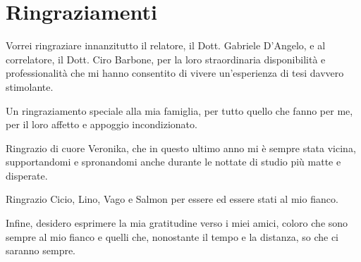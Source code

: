 \chapter{Ringraziamenti}
Vorrei ringraziare innanzitutto  il relatore, il Dott. Gabriele D'Angelo, e al correlatore, il Dott. Ciro Barbone, per la loro straordinaria disponibilità e professionalità che mi hanno consentito di vivere un'esperienza di tesi davvero stimolante.

 Un ringraziamento speciale alla mia famiglia, per tutto quello che fanno per me, per il loro affetto  e appoggio incondizionato.
 
 Ringrazio di cuore Veronika, che in questo ultimo anno mi è sempre stata  vicina, supportandomi  e spronandomi anche durante le nottate di studio più matte e disperate.

 Ringrazio Cicio, Lino, Vago e Salmon per essere ed essere stati al mio fianco.
 
 Infine, desidero esprimere la mia gratitudine verso i miei amici, coloro che sono sempre  al mio fianco e quelli che, nonostante il tempo e la distanza, so che ci saranno sempre.
 